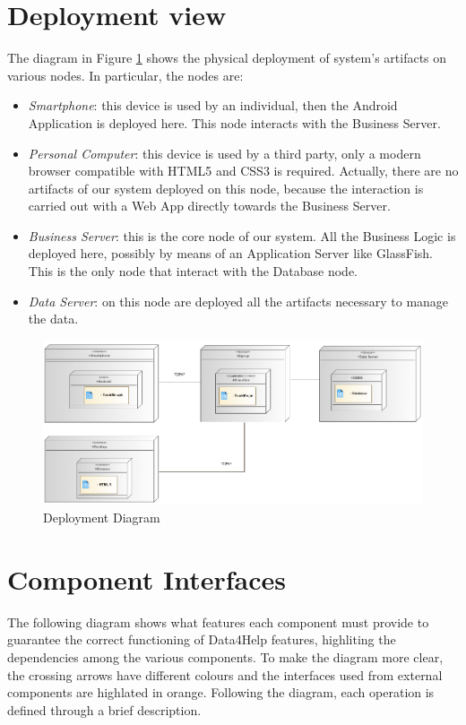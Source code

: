 \section{Deployment view}



The diagram in Figure \ref{f:depl_diag} shows the physical deployment of system's artifacts on various nodes.
In particular, the nodes are:

\begin{itemize}
\item \textit{Smartphone}: this device is used by an individual, then the Android Application is deployed here. This node interacts with the Business Server.
\item \textit{Personal Computer}: this device is used by a third party, only a modern browser compatible with HTML5 and CSS3 is required. Actually, there are no artifacts of our system deployed on this node, because the interaction is carried out with a Web App directly towards the Business Server.
\item \textit{Business Server}: this is the core node of our system.
All the Business Logic is deployed here, possibly by means of an Application Server like GlassFish.
This is the only node that interact with the Database node.
\item \textit{Data Server}: on this node are deployed all the artifacts necessary to manage the data.
\end{itemize}


\begin{figure}[h]
\centering
\includegraphics[width=\linewidth]{resources/uml/depldiag}
\caption{Deployment Diagram}\label{f:depl_diag}
\end{figure}

\section{Component Interfaces}
The following diagram shows what features each component must provide to guarantee the correct functioning of Data4Help features, highliting the dependencies among the various components.
To make the diagram more clear, the crossing arrows have different colours and the interfaces used from external components are highlated in orange.
Following the diagram, each operation is defined through a brief description.

